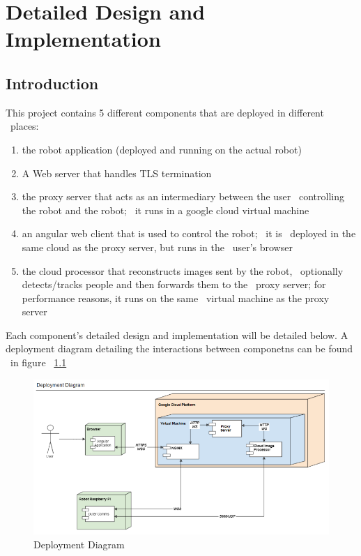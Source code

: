 \chapter{Detailed Design and Implementation}
\label{ch:implementation}

\section{Introduction}
\label{sec:implementation-introduction}
This project contains 5 different components that are deployed in different \
places:
\begin{enumerate}
    \item the robot application (deployed and running on the actual robot)
    \item A Web server that handles TLS termination
    \item the proxy server that acts as an intermediary between the user \
            controlling the robot and the robot; \
            it runs in a google cloud virtual machine
    \item an angular web client that is used to control the robot; \
            it is \
            deployed in the same cloud as the proxy server, but runs in the \
            user's browser
    \item the cloud processor that reconstructs images sent by the robot, \
            optionally detects/tracks people and then forwards them to the \
            proxy server; for performance reasons, it runs on the same \
            virtual machine as the proxy server
\end{enumerate}

Each component's detailed design and implementation will be detailed below.
A deployment diagram detailing the interactions between componetns can be found \
in figure ~\ref{fig:deployment-diagram}

\begin{figure}[ht]
    \label{fig:deployment-diagram}
    \centering
    \includegraphics[keepaspectratio]{img/deployment4.PNG}
    \caption{Deployment Diagram}
\end{figure}

